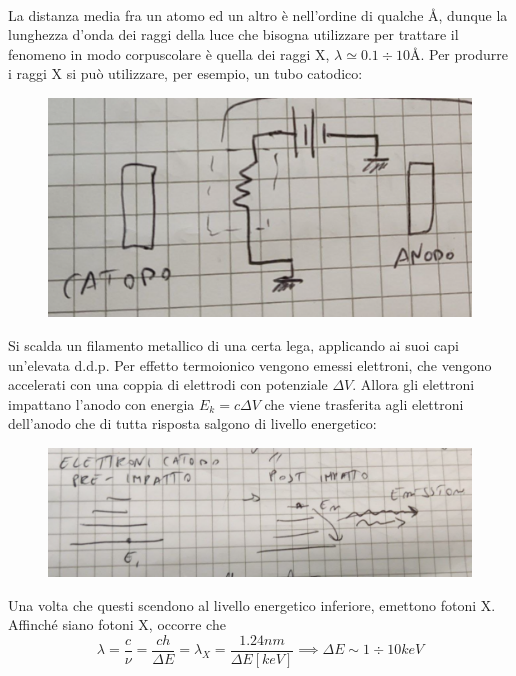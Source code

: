 \documentclass{book}
\begin{document}
        \paragraph{}
            La distanza media fra un atomo ed un altro è nell'ordine di qualche \si{\angstrom}, dunque la lunghezza d'onda dei raggi della luce che bisogna utilizzare per trattare il fenomeno in modo corpuscolare è quella dei raggi X, $\lambda \simeq 0.1 \div 10 $\r{A}. Per produrre i raggi X si può utilizzare, per esempio, un tubo catodico:
            \begin{figure}[h!]
                \centering
                \includegraphics[width=0.85\linewidth]{img/tuboCatodicoLez8.png}
            \end{figure}
            Si scalda un filamento metallico di una certa lega, applicando ai suoi capi un'elevata d.d.p. Per effetto termoionico vengono emessi elettroni, che vengono accelerati con una coppia di elettrodi con potenziale $\Delta V$. Allora gli elettroni impattano l'anodo con energia $E_{k}=c \Delta V$ che viene trasferita agli elettroni dell'anodo che di tutta risposta salgono di livello energetico:
            \begin{figure}[h!]
                \centering
                \includegraphics[width=0.85\linewidth]{img/elettroniSaltoLez8.png}
                \label{fig:enter-label}
            \end{figure}
            Una volta che questi scendono al livello energetico inferiore, emettono fotoni X.
            Affinché siano fotoni X, occorre che $$\lambda = \displaystyle \frac{c}{\nu} = \frac{c h}{\Delta E} = \lambda_{X} = \frac{1.24nm}{\Delta E[keV]} \implies \Delta E \sim 1 \div 10 keV$$
            \newpage
\end{document}
